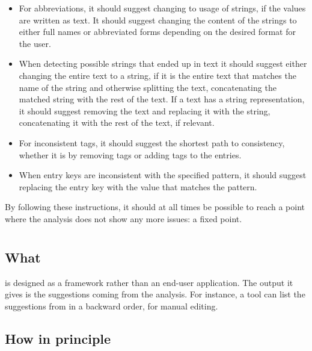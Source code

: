 \begin{itemize}
\item For abbreviations, it should suggest changing to usage of
  strings, if the values are written as text.  It should suggest
  changing the content of the strings to either full names or
  abbreviated forms depending on the desired format for the user.

\item When detecting possible strings that ended up in text it should
  suggest either changing the entire text to a string, if it is the
  entire text that matches the name of the string and otherwise
  splitting the text, concatenating the matched string with the rest
  of the text.  If a text has a string representation, it should
  suggest removing the text and replacing it with the string,
  concatenating it with the rest of the text, if relevant.

\item For inconsistent tags, it should suggest the shortest path to
  consistency, whether it is by removing tags or adding tags to the
  entries.

\item When entry keys are inconsistent with the specified pattern, it
  should suggest replacing the entry key with the value that matches
  the pattern.
\end{itemize}

By following these instructions, it should at all times be possible to
reach a point where the analysis does not show any more issues: a
fixed point.


\section{\orangutan}

\subsection{What}
\label{sec:organizing_orangutan_what}

{\orangutan} is designed as a framework rather than an end-user
application.  The output it gives is the suggestions coming from the
analysis.  For instance, a tool can list the suggestions from
{\orangutan} in a backward order, for manual editing.


\subsection{How in principle}
\label{sec:organizing_orangutan_how_principle}

